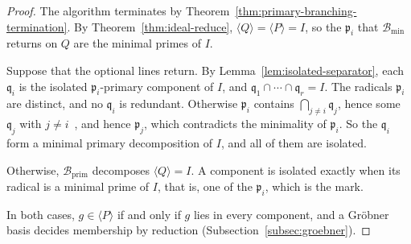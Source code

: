 \begin{proof}
  The algorithm terminates by
  Theorem~\ref{thm:primary-branching-termination}. By
  Theorem~\ref{thm:ideal-reduce}, $\langle Q\rangle=\langle P\rangle=I$, so
  the $\mathfrak p_i$ that $\mathcal B_{\min}$ returns on $Q$ are the minimal
  primes of $I$.

  Suppose that the optional lines return. By
  Lemma~\ref{lem:isolated-separator}, each $\mathfrak q_i$ is the isolated
  $\mathfrak p_i$-primary component of $I$, and
  $\mathfrak q_1\cap\cdots\cap\mathfrak q_r=I$. The radicals $\mathfrak p_i$ are
  distinct, and no $\mathfrak q_i$ is redundant. Otherwise $\mathfrak p_i$
  contains $\bigcap_{j\neq i}\mathfrak q_j$, hence some $\mathfrak q_j$ with
  $j\neq i$~\cite[Prop.~1.11]{atiyah1969introduction}, and hence
  $\mathfrak p_j$, which contradicts the minimality of $\mathfrak p_i$. So the
  $\mathfrak q_i$ form a minimal primary decomposition of $I$, and all of them
  are isolated.

  Otherwise, $\mathcal B_{\mathrm{prim}}$ decomposes $\langle Q\rangle=I$. A
  component is isolated exactly when its radical is a minimal prime of $I$, that
  is, one of the $\mathfrak p_i$, which is the mark.

  In both cases, $g\in\langle P\rangle$ if and only if $g$ lies in every
  component, and a Gr\"obner basis decides membership by reduction
  (Subsection~\ref{subsec:groebner}).
\end{proof}
